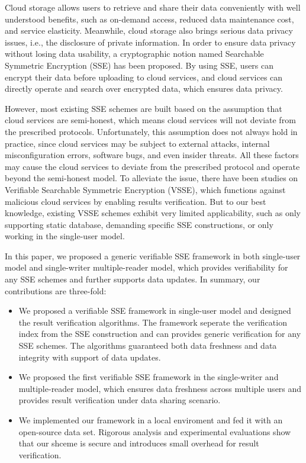 \begin{eabstract}
  Cloud storage allows users to retrieve and share their data conveniently with well understood benefits, such as on-demand access, reduced data maintenance cost, and service elasticity.
  Meanwhile, cloud storage also brings serious data privacy issues, i.e., the disclosure of private information. In order to ensure data privacy without losing data usability,
  a cryptographic notion named
  Searchable Symmetric Encryption (SSE) has been proposed. By using SSE, users can encrypt their data before uploading to cloud services, and cloud services can directly operate and search over encrypted data, which ensures data privacy.

  However, most existing SSE schemes are built based on the assumption that cloud services are semi-honest, which means cloud services will not deviate from the prescribed protocols. Unfortunately, this assumption does not always hold in practice, since cloud services may be subject to external attacks, internal misconfiguration errors, software bugs, and even insider threats. All these factors may cause the cloud services to deviate from the prescribed protocol and operate beyond the semi-honest model.
  To alleviate the issue, there have been studies on Verifiable Searchable Symmetric Encryption (VSSE), which functions against malicious cloud services by enabling results verification. But to our best knowledge, existing VSSE schemes exhibit very limited applicability, such as only supporting static database, demanding specific SSE constructions, or only working in the single-user model.

  In this paper, we proposed a generic verifiable SSE framework in both single-user model and single-writer multiple-reader model, which provides verifiability for any SSE schemes and further supports data updates. In summary, our contributions are three-fold:
  \begin{itemize}
    \item We proposed a verifiable SSE framework in single-user model and designed the result verification algorithms. The framework seperate the verification index from the SSE construction and can provides generic verification for any SSE schemes. The algorithms guaranteed both data freshness and data integrity with support of data updates.
    \item We proposed the first verifiable SSE framework in the single-writer and multiple-reader model, which ensures data freshness across multiple users and provides result verification under data sharing scenario.
    \item We implemented our framework in a local enviroment and fed it with an open-source data set. Rigorous analysis and experimental evaluations show that our shceme is secure and introduces small overhead for result verification.
  \end{itemize}
\end{eabstract}

